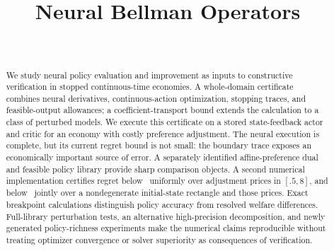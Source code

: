 \documentclass[ecta]{econsocart}
\theoremstyle{remark}
\begin{document}
\begin{frontmatter}
\title{Neural Bellman Operators}
\begin{aug}
\author[id=au1,addressref={add1}]{~}
\address[id=add1]{}
\end{aug}
\begin{abstract}
We study neural policy evaluation and improvement as inputs to constructive verification in stopped continuous-time economies. A whole-domain certificate combines neural derivatives, continuous-action optimization, stopping traces, and feasible-output allowances; a coefficient-transport bound extends the calculation to a class of perturbed models. We execute this certificate on a stored state-feedback actor and critic for an economy with costly preference adjustment. The neural execution is complete, but its current regret bound is not small: the boundary trace exposes an economically important source of error. A separately identified affine-preference dual and feasible policy library provide sharp comparison objects. A second numerical implementation certifies regret below \pricebound\ uniformly over adjustment prices in $[.5,8]$, and below \statebound\ jointly over a nondegenerate initial-state rectangle and those prices. Exact breakpoint calculations distinguish policy accuracy from resolved welfare differences. Full-library perturbation tests, an alternative high-precision decomposition, and newly generated policy-richness experiments make the numerical claims reproducible without treating optimizer convergence or solver superiority as consequences of verification.
\end{abstract}
\begin{keyword}
\end{keyword}
\end{frontmatter}

\begin{appendix}

\end{appendix}

\end{document}
